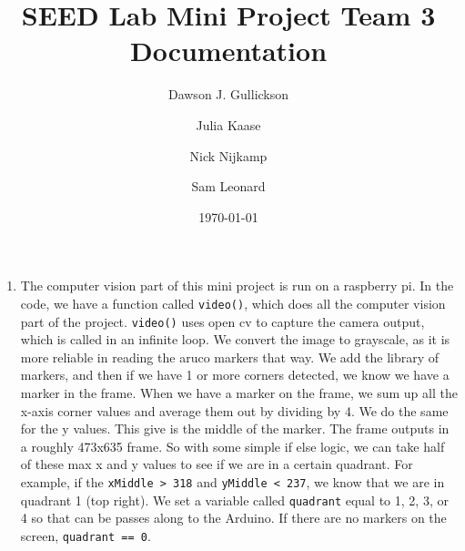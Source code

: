 \documentclass{article}
\title{SEED Lab Mini Project Team 3 Documentation}
\author{
    Dawson J. Gullickson
    \and
    Julia Kaase
    \and
    Nick Nijkamp
    \and
    Sam Leonard
}
\date{\today}
\begin{document}
    \maketitle
	
    \begin{enumerate}
        \item The computer vision part of this mini project is run on a raspberry pi. In the code, we have a function called \verb|video()|, which does all the computer vision part of the project. \verb|video()| uses open cv to capture the camera output, which is called in an infinite loop. We convert the image to grayscale, as it is more reliable in reading the aruco markers that way. We add the library of markers, and then if we have 1 or more corners detected, we know we have a marker in the frame. When we have a marker on the frame, we sum up all the x-axis corner values and average them out by dividing by 4. We do the same for the y values. This give is the middle of the marker. The frame outputs in a roughly 473x635 frame. So with some simple if else logic, we can take half of these max x and y values to see if we are in a certain quadrant. For example, if the \verb|xMiddle > 318| and \verb|yMiddle < 237|, we know that we are in quadrant 1 (top right). We set a variable called \verb|quadrant| equal to 1, 2, 3, or 4 so that can be passes along to the Arduino. If there are no markers on the screen, \verb|quadrant == 0|.
        

\end{enumerate}
\end{document}
